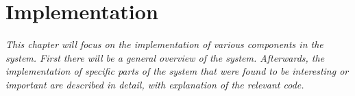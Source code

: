 \chapter{Implementation}
\label{cha:implementation}

\textit{This chapter will focus on the implementation of various components in the system. First there will be a general overview of the system. Afterwards, the implementation of specific parts of the system that were found to be interesting or important are described in detail, with explanation of the relevant code.} \newpage






